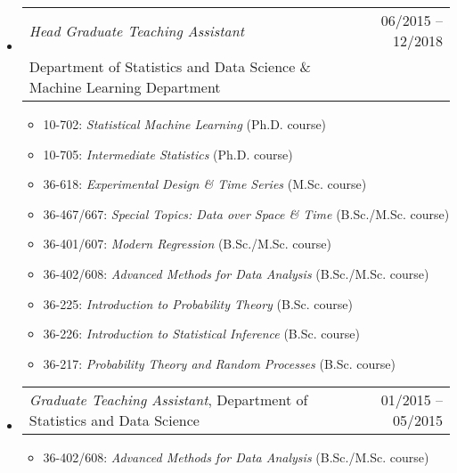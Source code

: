 \documentclass[letterpaper,10pt]{article}
\makeatletter
\newcommand{\subheadingoneline}[2]{
\begin{tabular*}{6.55in}{l@{\cftdotfill{\cftsecdotsep}\extracolsep{\fill}}r}
#1 & #2 \\ 
\end{tabular*}}
\newcommand{\subheadingtwolines}[4]{
\begin{tabular*}{6.55in}{l@{\cftdotfill{\cftsecdotsep}\extracolsep{\fill}}r}
#1 & #2 \\
#3 & #4 \\
\end{tabular*}}
\makeatother
\begin{document}
\begin{itemize}[leftmargin=0.4cm]
\vspace{0.02cm}
\item[] \hspace{-2ex}\subheadingtwolines{\it Head Graduate Teaching Assistant}{06/2015 -- 12/2018}{Department of Statistics and Data Science \& Machine Learning Department}{}
\begin{itemize}[leftmargin=0.4cm, rightmargin=0cm]
\item 10-702: \hspace{5.9ex}\emph{Statistical Machine Learning} (Ph.D. course) 
\item 10-705: \hspace{4.95ex} \emph{Intermediate Statistics} (Ph.D. course) 
\item 36-618: \hspace{5.95ex}\emph{Experimental Design \& Time Series} (M.Sc. course)
\item 36-467/667:\hspace{1.27ex}  \emph{Special Topics: Data over Space \& Time} (B.Sc./M.Sc. course)
\item 36-401/607: \hspace{1.27ex}\emph{Modern Regression} (B.Sc./M.Sc. course)
\item 36-402/608: \hspace{1.27ex}\emph{Advanced Methods for Data Analysis} (B.Sc./M.Sc. course)
\item 36-225: \hspace{6ex}\emph{Introduction to Probability Theory} (B.Sc. course)
\item 36-226: \hspace{6ex}\emph{Introduction to Statistical Inference} (B.Sc. course)
\item 36-217: \hspace{5.9ex}\emph{Probability Theory and Random Processes} (B.Sc. course)
\end{itemize}

\vspace{0.05cm}

\item[] \hspace{-2.2ex}\subheadingoneline{{\it Graduate Teaching Assistant}, Department of Statistics and Data Science}{01/2015 -- 05/2015}
\begin{itemize}[leftmargin=0.4cm, rightmargin=0cm]
\item 36-402/608: \hspace{1.28ex}\emph{Advanced Methods for Data Analysis} (B.Sc./M.Sc. course)
\end{itemize}

\end{itemize}
\end{document}
